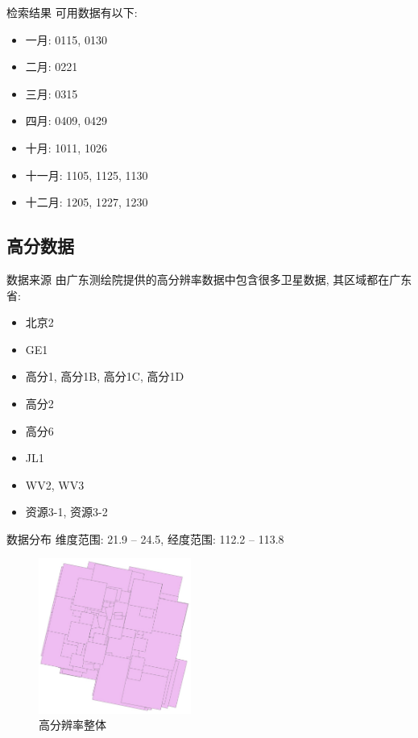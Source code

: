 \begin{frame}{检索结果}
    \small 
    可用数据有以下:
    \begin{itemize}
        \item 一月: 0115, 0130
        \item 二月: 0221
        \item 三月: 0315
        \item 四月: 0409, 0429
        \item 十月: 1011, 1026
        \item 十一月: 1105, 1125, 1130
        \item 十二月: 1205, 1227, 1230
    \end{itemize}
\end{frame}

\subsection{高分数据}
\begin{frame}{数据来源}
    由广东测绘院提供的高分辨率数据中包含很多卫星数据, 其区域都在广东省:
    \begin{itemize}
        \item 北京2
        \item GE1
        \item 高分1, 高分1B, 高分1C, 高分1D
        \item 高分2
        \item 高分6
        \item JL1
        \item WV2, WV3
        \item 资源3-1, 资源3-2
    \end{itemize}
\end{frame}

\begin{frame}{数据分布}
    维度范围: 21.9 -- 24.5, 经度范围: 112.2 -- 113.8
    \begin{figure}
        \centering
        \includegraphics[width=5cm]{pic/pic0110.jpg}
        \caption{高分辨率整体}
        \label{fig:0106}
    \end{figure}
\end{frame}

